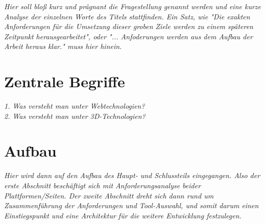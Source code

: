 \emph{Hier soll bloß kurz und prägnant die Fragestellung genannt werden und eine kurze Analyse der einzelnen Worte des Titels stattfinden. Ein Satz, wie "Die exakten Anforderungen für die Umsetzung dieser groben Ziele werden zu einem späteren Zeitpunkt herausgearbeitet", oder "... Anfoderungen werden aus dem Aufbau der Arbeit heraus klar." muss hier hinein.}

\section{Zentrale Begriffe}
\label{sec:zentrale_begriffe}

\emph{1. Was versteht man unter Webtechnologien?\\2. Was versteht man unter 3D-Technologien?}

\section{Aufbau}
\label{sec:aufbau}

\emph{Hier wird dann auf den Aufbau des Haupt- und Schlussteils eingegangen. Also der erste Abschnitt beschäftigt sich mit Anforderungsanalyse beider Plattformen/Seiten. Der zweite Abschnitt dreht sich dann rund um Zusammenf\"uhrung der Anforderungen und Tool-Auswahl, und somit darum einen Einstiegspunkt und eine Architektur f\"ur die weitere Entwicklung festzulegen. }